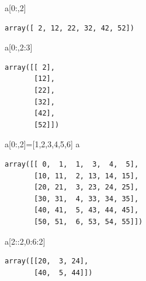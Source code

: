 \documentclass[
  letterpaper,
  DIV=11,
  numbers=noendperiod]{scrreprt}
\newenvironment{Shaded}{\begin{snugshade}}{\end{snugshade}}
\newcommand{\DecValTok}[1]{\textcolor[rgb]{0.68,0.00,0.00}{#1}}
\newcommand{\NormalTok}[1]{\textcolor[rgb]{0.00,0.23,0.31}{#1}}
\newcommand{\OperatorTok}[1]{\textcolor[rgb]{0.37,0.37,0.37}{#1}}
\begin{document}
\begin{Shaded}
\begin{Highlighting}[]
\NormalTok{a[}\DecValTok{0}\NormalTok{:,}\DecValTok{2}\NormalTok{]}
\end{Highlighting}
\end{Shaded}

\begin{verbatim}
array([ 2, 12, 22, 32, 42, 52])
\end{verbatim}

\begin{Shaded}
\begin{Highlighting}[]
\NormalTok{a[}\DecValTok{0}\NormalTok{:,}\DecValTok{2}\NormalTok{:}\DecValTok{3}\NormalTok{]}
\end{Highlighting}
\end{Shaded}

\begin{verbatim}
array([[ 2],
       [12],
       [22],
       [32],
       [42],
       [52]])
\end{verbatim}

\begin{Shaded}
\begin{Highlighting}[]
\NormalTok{a[}\DecValTok{0}\NormalTok{:,}\DecValTok{2}\NormalTok{]}\OperatorTok{=}\NormalTok{[}\DecValTok{1}\NormalTok{,}\DecValTok{2}\NormalTok{,}\DecValTok{3}\NormalTok{,}\DecValTok{4}\NormalTok{,}\DecValTok{5}\NormalTok{,}\DecValTok{6}\NormalTok{]}
\NormalTok{a}
\end{Highlighting}
\end{Shaded}

\begin{verbatim}
array([[ 0,  1,  1,  3,  4,  5],
       [10, 11,  2, 13, 14, 15],
       [20, 21,  3, 23, 24, 25],
       [30, 31,  4, 33, 34, 35],
       [40, 41,  5, 43, 44, 45],
       [50, 51,  6, 53, 54, 55]])
\end{verbatim}

\begin{Shaded}
\begin{Highlighting}[]
\NormalTok{a[}\DecValTok{2}\NormalTok{::}\DecValTok{2}\NormalTok{,}\DecValTok{0}\NormalTok{:}\DecValTok{6}\NormalTok{:}\DecValTok{2}\NormalTok{]}
\end{Highlighting}
\end{Shaded}

\begin{verbatim}
array([[20,  3, 24],
       [40,  5, 44]])
\end{verbatim}
\end{document}
